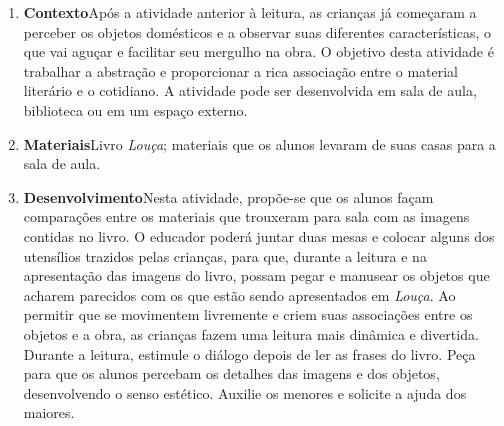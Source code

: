 \documentclass[11pt]{extarticle}
\begin{document}
\begin{enumerate}
\item \textbf{Contexto}\quad Após a atividade anterior à leitura, as crianças já 
começaram a perceber os objetos domésticos e a observar suas diferentes características, o que vai aguçar e facilitar seu mergulho na obra. O objetivo desta atividade é
trabalhar a abstração e proporcionar a rica associação entre o material literário e o cotidiano. A atividade pode ser desenvolvida em sala de aula, biblioteca ou em um espaço externo.

\item \textbf{Materiais}\quad Livro \textit{Louça}; materiais que os alunos levaram de suas casas para a sala de aula.



\item \textbf{Desenvolvimento}\quad Nesta atividade, propõe-se que os alunos façam comparações entre os materiais que trouxeram para sala com as imagens contidas no livro.
O educador poderá juntar duas mesas e colocar alguns dos utensílios trazidos pelas crianças, para que, durante a leitura e na apresentação das imagens do livro, possam pegar e manusear os objetos que acharem parecidos com os que estão sendo apresentados em \textit{Louça}. Ao permitir que se movimentem livremente e criem suas associações entre os objetos e a obra, as crianças fazem uma leitura mais dinâmica e divertida. Durante a leitura, estimule o diálogo depois de ler as frases do livro. Peça para que os alunos percebam os detalhes das imagens e dos objetos, desenvolvendo o senso estético. Auxilie os menores e solicite a ajuda dos maiores. 
 

\end{enumerate}
\end{document}
